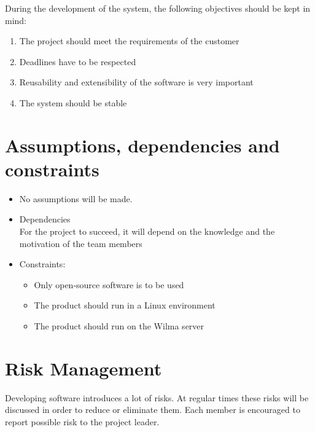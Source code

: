 \documentclass[a4paper, 12pt]{report}
\begin{document}
			During the development of the system, the following objectives should be kept
			in mind:
			
			\begin{enumerate}
				
				\item The project should meet the requirements of the customer
				\item Deadlines have to be respected
				\item Reusability and extensibility of the software is very important
				\item The system should be stable
				
			\end{enumerate}	
			
		\section{Assumptions, dependencies and constraints}
			
			\begin{itemize}
				
				\item No assumptions will be made.
				
				\item Dependencies \\
 					  For the project to succeed, it will depend on
					  the knowledge and the motivation of the team members	
				
				\item Constraints:
				\begin{itemize}
					\item Only open-source software is to be used
					\item The product should run in a Linux environment
					\item The product should run on the Wilma server
				\end{itemize}
				
			\end{itemize}	
			
		\section{Risk Management}
			
			Developing software introduces a lot of risks. At regular times these risks will
			be discussed in order to reduce or eliminate them. Each member is encouraged to report
			possible risk to the project leader.
			
\end{document}
